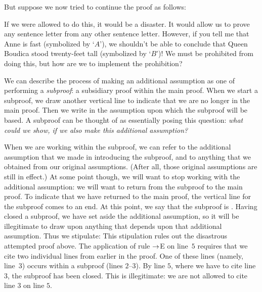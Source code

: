 But suppose we now tried to continue the proof as follows:
\begin{fitchproof}
	\PR
	\open
		\AS
		 
	\close
\ifHTMLtarget
	 
\else
	 
	 
\fi
\end{fitchproof}
If we were allowed to do this, it would be a disaster. It would allow us to prove any sentence letter from any other sentence letter. However, if you tell me that Anne is fast (symbolized by `$A$'), we shouldn't be able to conclude that Queen Boudica stood twenty-feet tall (symbolized by `$B$')! We must be prohibited from doing this, but how are we to implement the prohibition?

We can describe the process of making an additional assumption as one of performing a \emph{subproof}: a subsidiary proof within the main proof. When we start a subproof, we draw another vertical line to indicate that we are no longer in the main proof. Then we write in the assumption upon which the subproof will be based. A subproof can be thought of as essentially posing this question: \emph{what could we show, if we also make this additional assumption?}

When we are working within the subproof, we can refer to the additional assumption that we made in introducing the subproof, and to anything that we obtained from our original assumptions. (After all, those original assumptions are still in effect.) At some point though, we will want to stop working with the additional assumption: we will want to return from the subproof to the main proof. To indicate that we have returned to the main proof, the vertical line for the subproof comes to an end. At this point, we say that the subproof is . Having closed a subproof, we have set aside the additional assumption, so it will be illegitimate to draw upon anything that depends upon that additional assumption. Thus we stipulate:
This stipulation rules out the disastrous attempted proof above. The application of rule $\rightarrow$E on line~$5$ requires that we cite two individual lines from earlier in the proof. One of these lines (namely, line~$3$) occurs within a subproof (lines $2$--$3$). By line $5$, where we have to cite line $3$, the subproof has been closed. This is illegitimate: we are not allowed to cite line $3$ on line $5$.

